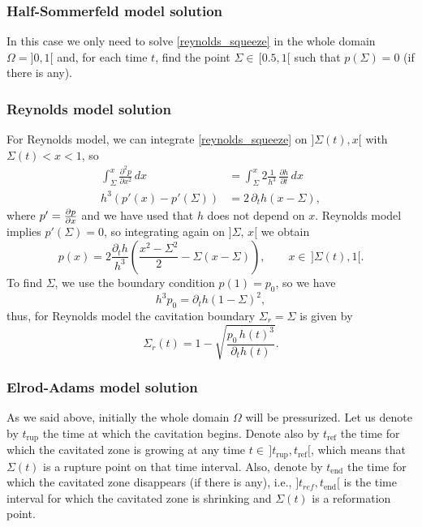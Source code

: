 \subsubsection*{Half-Sommerfeld model solution}
In this case we only need to solve  \eqref{reynolds_squeeze} in the whole domain $\Omega
=]0,1[$ and, for each time $t$, find the point $\Sigma\in\, [0.5,1[$ such that $p(\Sigma)=0$ (if there is any).
\subsubsection*{Reynolds model solution} 
For Reynolds model, we can integrate \eqref{reynolds_squeeze} on $]\Sigma(t),x[$ with $\Sigma(t)<x<1$, so
\begin{align*}
\int_\Sigma^x\frac{\partial^2 p}{\partial x^2}\,dx&=\int_\Sigma^x 2\frac{1}{h^3}\,\frac{\partial h}{\partial t }\,dx\\
h^3\left(p'(x)-p'(\Sigma)\right)&=2\,\partial_t h\left(x-\Sigma\right),
\end{align*}
where $p'=\frac{\partial p}{\partial x}$ and we have used that $h$ does not depend on $x$. Reynolds model implies $p'(\Sigma)=0$, so integrating again on $]\Sigma,\,x[$ we obtain
$$p(x)=2\frac{\partial_t h}{h^3}\left(\frac{x^2-\Sigma^2}{2}-\Sigma\left(x-\Sigma\right)\right),\qquad x\in\, ]\Sigma(t),1[.$$
To find $\Sigma$, we use the boundary condition $p(1)=p_0$, so we have
$$h^3 p_0=\partial_t h\left(1-\Sigma\right)^2, $$
thus, for Reynolds model the cavitation boundary $\Sigma_r=\Sigma$ is given by
\begin{equation}
\Sigma_r(t)=1-\sqrt{\frac{p_0\,h(t)^3}{\partial_t h(t)}}.\label{eq:sigma_reynolds}
\end{equation}
\subsubsection*{Elrod-Adams model solution}

As we said above, initially the whole domain $\Omega$ will be pressurized. Let us denote by $t_\text{rup}$ the time at which the cavitation begins. Denote also by $t_\text{ref}$ the time for which the cavitated zone is growing at any time $t\in\,]t_\text{rup},t_\text{ref}[$, which means that $\Sigma(t)$ is a rupture point on that time interval. Also, denote by $t_\text{end}$ the time for which the cavitated zone disappears (if there is any), i.e., $]t_{ref},t_\text{end}[$ is the time interval for which the cavitated zone is shrinking and $\Sigma(t)$ is a reformation point. 

